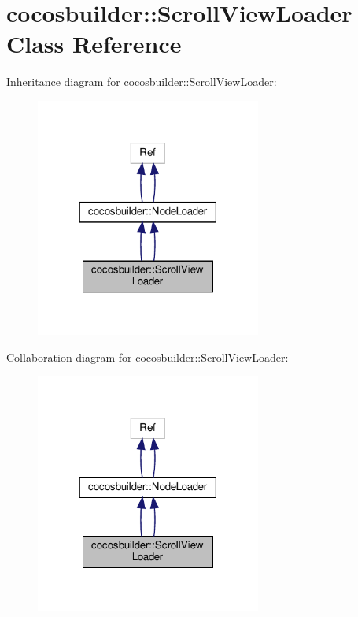 \hypertarget{classcocosbuilder_1_1ScrollViewLoader}{}\section{cocosbuilder\+:\+:Scroll\+View\+Loader Class Reference}
\label{classcocosbuilder_1_1ScrollViewLoader}


Inheritance diagram for cocosbuilder\+:\+:Scroll\+View\+Loader\+:
\nopagebreak
\begin{figure}[H]
\begin{center}
\leavevmode
\includegraphics[width=210pt]{classcocosbuilder_1_1ScrollViewLoader__inherit__graph}
\end{center}
\end{figure}


Collaboration diagram for cocosbuilder\+:\+:Scroll\+View\+Loader\+:
\nopagebreak
\begin{figure}[H]
\begin{center}
\leavevmode
\includegraphics[width=210pt]{classcocosbuilder_1_1ScrollViewLoader__coll__graph}
\end{center}
\end{figure}
